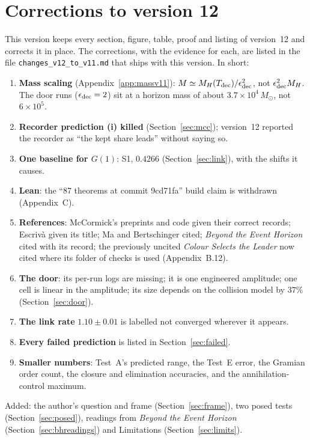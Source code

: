 \section{Corrections to version 12}\label{app:corrv11}

This version keeps every section, figure, table, proof and listing of version~12 and corrects it in place. The corrections, with the evidence for each, are listed in the file \texttt{changes\_v12\_to\_v11.md} that ships with this version. In short:
\begin{enumerate}
\item \textbf{Mass scaling} (Appendix~\ref{app:massv11}): $M\simeq M_H(T_{\rm dec})/\epsilon_{\rm dec}^2$, not $\epsilon_{\rm dec}^2M_H$. The door runs ($\epsilon_{\rm dec}=2$) sit at a horizon mass of about $3.7\times10^4\,M_\odot$, not $6\times10^5$.
\item \textbf{Recorder prediction (i) killed} (Section~\ref{sec:mcc}); version~12 reported the recorder as ``the kept share leads'' without saying so.
\item \textbf{One baseline for $G(1)$}: S1, $0.4266$ (Section~\ref{sec:link}), with the shifts it causes.
\item \textbf{Lean}: the ``87 theorems at commit 9cd71fa'' build claim is withdrawn (Appendix~C).
\item \textbf{References}: McCormick's preprints and code given their correct records; Escriv\`a given its title; Ma and Bertschinger cited; \emph{Beyond the Event Horizon} cited with its record; the previously uncited \emph{Colour Selects the Leader} now cited where its folder of checks is used (Appendix~B.12).
\item \textbf{The door}: its per-run logs are missing; it is one engineered amplitude; one cell is linear in the amplitude; its size depends on the collision model by $37\%$ (Section~\ref{sec:door}).
\item \textbf{The link rate} $1.10\pm0.01$ is labelled not converged wherever it appears.
\item \textbf{Every failed prediction} is listed in Section~\ref{sec:failed}.
\item \textbf{Smaller numbers}: Test~A's predicted range, the Test~E error, the Gramian order count, the closure and elimination accuracies, and the annihilation-control maximum.
\end{enumerate}
Added: the author's question and frame (Section~\ref{sec:frame}), two posed tests (Section~\ref{sec:posed}), readings from \emph{Beyond the Event Horizon} (Section~\ref{sec:bhreadings}) and Limitations (Section~\ref{sec:limits}).

